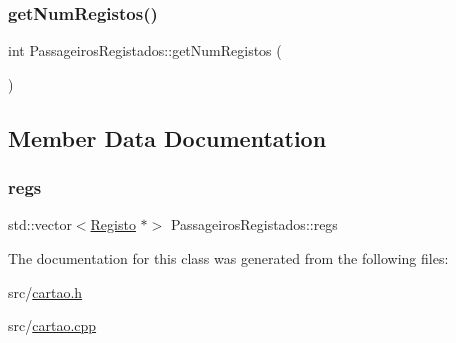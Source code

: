 \mbox{\label{class_passageiros_registados_a498a9a9e6f162197bdd30f77e0a2f2ae}} 
\subsubsection{\texorpdfstring{get\+Num\+Registos()}{getNumRegistos()}}
{\footnotesize\ttfamily int Passageiros\+Registados\+::get\+Num\+Registos (\begin{DoxyParamCaption}{ }\end{DoxyParamCaption})}



\subsection{Member Data Documentation}
\mbox{\label{class_passageiros_registados_a8272ae4415158ec15f95b3331b0238f3}} 
\subsubsection{\texorpdfstring{regs}{regs}}
{\footnotesize\ttfamily std\+::vector$<$\mbox{\hyperlink{class_registo}{Registo}} $\ast$$>$ Passageiros\+Registados\+::regs\hspace{0.3cm}{\ttfamily [private]}}



The documentation for this class was generated from the following files\+:\begin{DoxyCompactItemize}
\item 
src/\mbox{\hyperlink{cartao_8h}{cartao.\+h}}\item 
src/\mbox{\hyperlink{cartao_8cpp}{cartao.\+cpp}}\end{DoxyCompactItemize}

